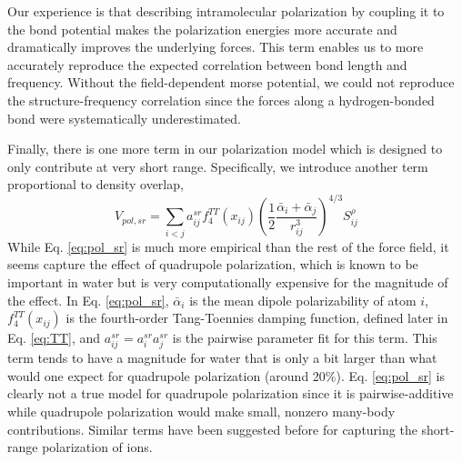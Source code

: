 \documentclass[journal=jacsat,manuscript=article]{achemso}
\begin{document}
Our experience is that describing intramolecular polarization by coupling it to the bond potential
makes the polarization energies more accurate and dramatically improves the underlying forces.
This term enables us to more accurately reproduce the expected correlation between bond length and
frequency. Without the field-dependent morse potential, we could not reproduce the structure-frequency correlation
since the forces along a hydrogen-bonded  bond were systematically underestimated.

Finally, there is one more term in our polarization model which is designed to only contribute at very
short range. Specifically, we introduce another term proportional to density overlap,
\begin{equation}
  V_{pol,sr}=\sum_{i<j}a_{ij}^{sr}f_4^{TT}(x_{ij})\left(\frac{1}{2}\frac{\bar{\alpha}_i + \bar{\alpha}_j}{r_{ij}^3}\right)^{4/3}S_{ij}^{\rho}
\label{eq:pol_sr}
\end{equation}
\noindent
While Eq. \ref{eq:pol_sr} is much more empirical than the rest of the force field,
it seems capture the effect of quadrupole polarization, which is known to be important
in water\cite{herman2023accurate} but is very computationally expensive for the magnitude of the effect.
In Eq. \ref{eq:pol_sr}, $\bar{\alpha}_i$ is the mean dipole polarizability of atom $i$, $f_4^{TT}(x_{ij})$
is the fourth-order Tang-Toennies damping function, defined later in Eq. \ref{eq:TT}, and $a_{ij}^{sr}=a_{i}^{sr}a_{j}^{sr}$ is
the pairwise parameter fit for this term. This term tends to have a magnitude for water
that is only a bit larger than what would one expect for quadrupole polarization (around 20\%). Eq. \ref{eq:pol_sr} is clearly
not a true model for quadrupole polarization since it is pairwise-additive
while quadrupole polarization would make small, nonzero many-body contributions. Similar terms
have been suggested before for capturing the short-range polarization of ions.\cite{sheng2022semiempirical}
\end{document}
